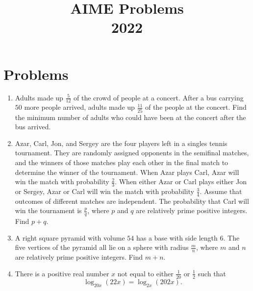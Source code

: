 \documentclass{article}
\title{AIME Problems \\ 2022}
\date{}
\begin{document}
\maketitle\thispagestyle{fancy}\newpage\section*{Problems}\begin{enumerate}[label=\arabic*., itemsep=0.5em]\item Adults made up $\frac5{12}$ of the crowd of people at a concert. After a bus carrying $50$ more people arrived, adults made up $\frac{11}{25}$ of the people at the concert. Find the minimum number of adults who could have been at the concert after the bus arrived.\par \vspace{0.5em}\item Azar, Carl, Jon, and Sergey are the four players left in a singles tennis tournament. They are randomly assigned opponents in the semifinal matches, and the winners of those matches play each other in the final match to determine the winner of the tournament. When Azar plays Carl, Azar will win the match with probability $\frac23$. When either Azar or Carl plays either Jon or Sergey, Azar or Carl will win the match with probability $\frac34$. Assume that outcomes of different matches are independent. The probability that Carl will win the tournament is $\frac{p}{q}$, where $p$ and $q$ are relatively prime positive integers. Find $p+q$.\par \vspace{0.5em}\item A right square pyramid with volume $54$ has a base with side length $6.$ The five vertices of the pyramid all lie on a sphere with radius $\frac mn$, where $m$ and $n$ are relatively prime positive integers. Find $m+n$.\par \vspace{0.5em}\item There is a positive real number $x$ not equal to either $\tfrac{1}{20}$ or $\tfrac{1}{2}$ such that
\begin{equation*}
\log_{20x} (22x)=\log_{2x} (202x).
\end{equation*}

\end{enumerate}
\end{document}

